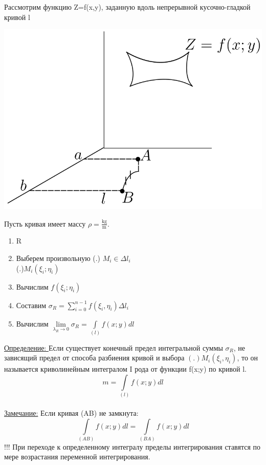 \documentclass[12pt]{article}
\let\ORIincludegraphics\includegraphics
\renewcommand{\includegraphics}[2][]{\ORIincludegraphics[scale=0.65,#1]{#2}}
\let\oldint\int
\let\oldsum\sum
\let\oldlim\lim
\renewcommand{\int}{\oldint\limits}
\renewcommand{\sum}{\oldsum\limits}
\renewcommand{\lim}{\oldlim\limits}
\begin{document}
  \vspace{1em}
  \par Рассмотрим функцию Z=f(x,y), заданную вдоль непрерывной кусочно-гладкой кривой l\\

  \begin{minipage}{0.45\textwidth}
    \includegraphics[scale=0.6]{8.1.2.png}
  \end{minipage}
  \hspace{1em} %
  \begin{minipage}{0.65\textwidth} %
      Пусть кривая имеет массу $\rho=\frac{\mathrm{kg}}{\mathrm{m}}$.
      \begin{enumerate}
        \item R
        \item Выберем произвольную (.) $M_i \in \Delta l_i$\\ (.)$M_i (\xi_i;\eta_i)$
        \item Вычислим $f(\xi_i;\eta_i)$
        \item Составим $\sigma_R = \sum_{i=0}^{n-1} f(\xi_i,\eta_i) \Delta l_i$
        \item Вычислим $\lim_{\lambda_R \to 0} \sigma_R = \int_{(l)} f(x;y) dl$
      \end{enumerate}
  \end{minipage}
  \vspace{1em}
  \par
  \underline{Определение: } Если существует конечный предел интегральной суммы $\sigma_R$, не 
  зависящий предел от способа разбиения кривой и выбора $(.) M_i(\xi_i,\eta_i)$, то он называется
  криволинейным интегралом I рода от функции f(x;y) по кривой l.\\
  \[m=\int_{(l)} f(x;y) dl\]\\
  \underline{Замечание:} Если кривая (AB) не замкнута: \[\int_{(AB)} f(x;y)dl = \int_{(BA)} f(x;y)dl\]
  !!! При переходе к определенному интегралу пределы интегрирования ставятся по мере возрастания
  переменной интегрирования.
\end{document}
